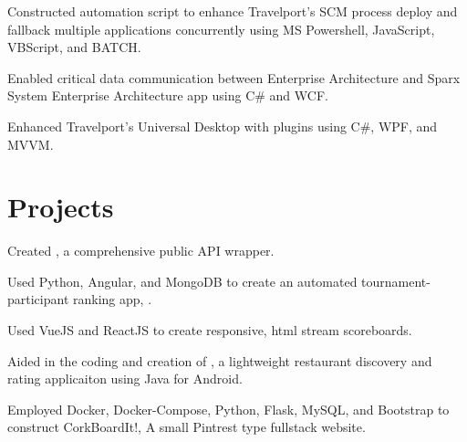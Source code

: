 \documentclass[]{deedy-resume-openfont}
\begin{document}
\begin{minipage}[t]{0.66\textwidth}
\begin{tightemize}
\item Constructed automation script to enhance Travelport's SCM process deploy and fallback multiple applications concurrently using MS Powershell, JavaScript, VBScript, and BATCH.
\item Enabled critical data communication between Enterprise Architecture and Sparx System Enterprise Architecture app using C\# and WCF.
\item Enhanced Travelport's Universal Desktop with plugins using C\#, WPF, and MVVM.
\end{tightemize}
\sectionsep


\section{Projects}
\begin{tightemize} 
\item Created \href{http://npmjs.com/package/smashgg.js}{}, a comprehensive \href{www.smash.gg}{} public API wrapper. 
\item Used Python, Angular, and MongoDB to create an automated tournament-participant ranking app, \href{https://notgarpr.com}{}.
\item Used VueJS and ReactJS to create responsive, html stream scoreboards. 
\end{tightemize}
\sectionsep

\begin{tightemize}
\item Aided in the coding and creation of \href{https://play.google.com/store/apps/details?id=com.gmail.japa.arialdis.tasteslikechickenlite&hl=en}{}, a lightweight restaurant discovery and rating applicaiton using Java for Android.
\item Employed Docker, Docker-Compose, Python, Flask, MySQL, and Bootstrap to construct CorkBoardIt!, A small Pintrest type fullstack website. 
\end{tightemize}
\sectionsep





\end{minipage} 
\end{document}
